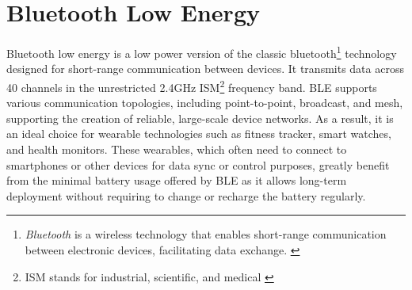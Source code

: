 \section{Bluetooth Low Energy}
Bluetooth low energy is a low power version of the classic bluetooth\footnote{\emph{Bluetooth} is a wireless technology that enables short-range communication between electronic devices, facilitating data exchange. \autocite{bluetooth_tech_overview}} technology designed for short-range communication between devices.
It transmits data across 40 channels in the unrestricted 2.4GHz ISM\footnote{ISM stands for industrial, scientific, and medical \autocite{bluetooth_tech_overview}} frequency band.
BLE supports various communication topologies, including point-to-point, broadcast, and mesh, supporting the creation of reliable, large-scale device networks. 
As a result, it is an ideal choice for wearable technologies such as fitness tracker, smart watches, and health monitors. 
\autocite{bluetooth_tech_overview}
These wearables, which often need to connect to smartphones or other devices for data sync or control purposes, greatly benefit from the minimal battery usage offered by BLE as it allows long-term deployment without requiring to change or recharge the battery regularly.
\autocite{strey2013ble}
